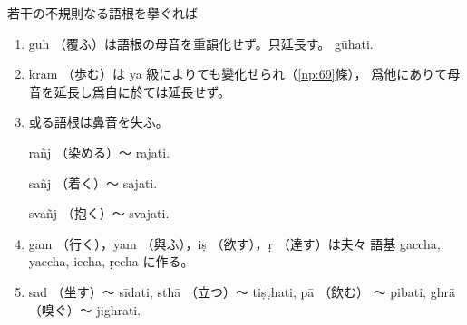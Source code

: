 \numberParagraph
若干の不規則なる語根を擧ぐれば
\begin{enumerate}[label=(\alph*)]
\item guh （覆ふ）は語根の母音を重韻化せず。只延長す。
gūhati.
\item kram （歩む）は ya 級によりても變化せられ（\ref{np:69}條），
爲他にありて母音を延長し爲自に於ては延長せず。
\item 或る語根は鼻音を失ふ。


\indent rañj （染める）～ rajati.

\indent sañj （着く）～ sajati.

\indent svañj （抱く）～ svajati.
\item gam （行く），yam （與ふ），iṣ （欲す），ṛ （達す）は夫々
語基 gaccha, yaccha, iccha, ṛccha に作る。
\item sad （坐す）～ sīdati, sthā （立つ）～ tiṣṭhati, pā （飲む）
～ pibati, ghrā （嗅ぐ）～ jighrati.
\end{enumerate}


